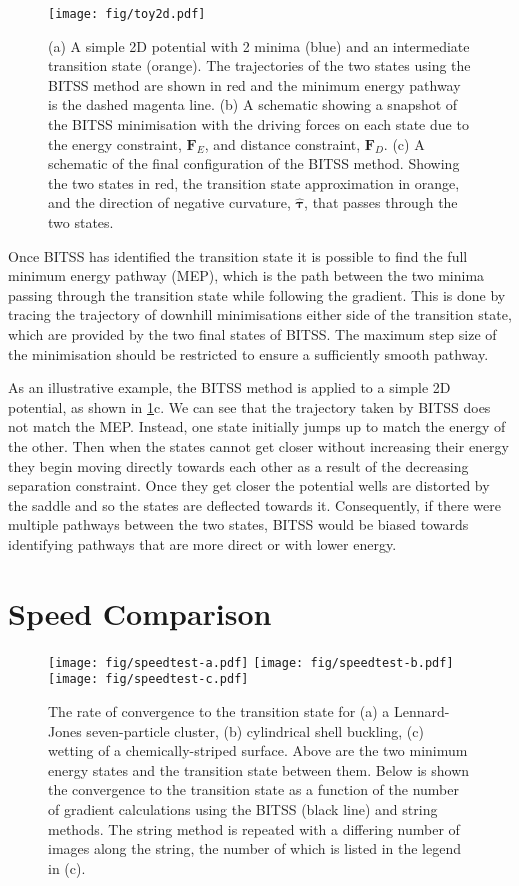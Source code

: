 \documentclass[aps,twocolumn]{revtex4}
\begin{document}
\begin{figure}[htb]
  \centering
  \texttt{[image: fig/toy2d.pdf]}
  \caption{ 
    (a) A simple 2D potential with 2 minima (blue) and an intermediate transition state (orange).
        The trajectories of the two states using the BITSS method are shown in red and the minimum energy pathway is the dashed magenta line.
    (b) A schematic showing a snapshot of the BITSS minimisation with the driving forces on each state due to the energy constraint, $\bm{F}_E$, and distance constraint, $\bm{F}_D$.
    (c) A schematic of the final configuration of the BITSS method.
        Showing the two states in red, the transition state approximation in orange, and the direction of negative curvature, $\bm{\hat{\tau}}$, that passes through the two states.
  }
  \label{fig:toy2d}
\end{figure}

Once BITSS has identified the transition state it is possible to find the full minimum energy pathway (MEP), which is the path between the two minima passing through the transition state while following the gradient.
This is done by tracing the trajectory of downhill minimisations either side of the transition state, which are provided by the two final states of BITSS.
The maximum step size of the minimisation should be restricted to ensure a sufficiently smooth pathway.

As an illustrative example, the BITSS method is applied to a simple 2D potential, as shown in \cref{fig:toy2d}c.
We can see that the trajectory taken by BITSS does not match the MEP.
Instead, one state initially jumps up to match the energy of the other.
Then when the states cannot get closer without increasing their energy they begin moving directly towards each other as a result of the decreasing separation constraint.
Once they get closer the potential wells are distorted by the saddle and so the states are deflected towards it.
Consequently, if there were multiple pathways between the two states, BITSS would be biased towards identifying pathways that are more direct or with lower energy.


\section{Speed Comparison}
\begin{figure*}[htb]
  \centering
  \texttt{[image: fig/speedtest-a.pdf]}%
  \texttt{[image: fig/speedtest-b.pdf]}%
  \texttt{[image: fig/speedtest-c.pdf]}%
  \caption{
    The rate of convergence to the transition state for (a) a Lennard-Jones seven-particle cluster, (b) cylindrical shell buckling, (c) wetting of a chemically-striped surface.
    Above are the two minimum energy states and the transition state between them.
    Below is shown the convergence to the transition state as a function of the number of gradient calculations using the BITSS (black line) and string methods.
    The string method is repeated with a differing number of images along the string, the number of which is listed in the legend in (c).
  }
  \label{fig:speedtest}
\end{figure*}
\end{document}
